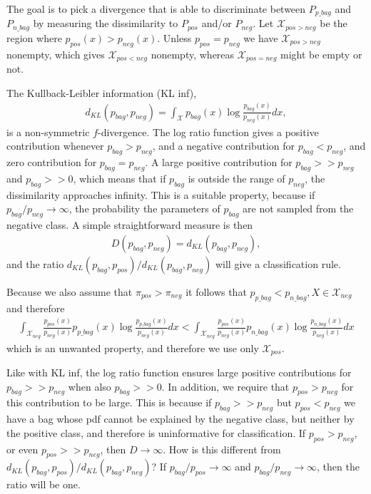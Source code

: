 The goal is to pick a divergence that is able to discriminate between $P_{p \_ bag}$ and $P_{n \_ bag}$ by measuring the dissimilarity to $P_{pos}$ and/or $P_{neg}$.
Let $\mathcal{X}_{pos > neg}$ be the region where $p_{pos}(x) > p_{neg}(x)$. 
Unless $p_{pos} = p_{neg}$ we have $\mathcal{X}_{pos > neg}$ nonempty, which gives $\mathcal{X}_{pos < neg}$ nonempty, whereas $\mathcal{X}_{pos = neg}$ might be empty or not. 

The Kullback-Leibler information (KL inf),
\begin{align}
  d_{KL}(p_{bag},p_{neg}) = \int_\mathcal{X} p_{bag}(x) \log \frac{p_{bag}(x)}{p_{neg}(x)} dx,
\end{align}
is a non-symmetric $f$-divergence.
The log ratio function gives a positive contribution whenever $p_{bag}>p_{neg}$, and a negative contribution for $p_{bag}<p_{neg}$, and zero contribution for $p_{bag} = p_{neg}$.
A large positive contribution for $p_{bag} >> p_{neg}$ and $p_{bag} >> 0$, which means that if $p_{bag}$ is outside the range of $p_{neg}$, the dissimilarity approaches infinity. 
This is a suitable property, because if $p_{bag}/p_{neg} \rightarrow \infty$, the probability the parameters of $p_{bag}$ are not sampled from the negative class. 
A simple straightforward measure is then
\begin{align}
  D(p_{bag},p_{neg}) = d_{KL} (p_{bag},p_{neg}),
\end{align}
and the ratio $d_{KL} (p_{bag},p_{pos})/d_{KL} (p_{bag},p_{neg})$ will give a classification rule.

Because we also assume that $\pi_{pos} > \pi_{neg}$ it follows that $p_{p \_ bag} < p_{n \_ bag}, X \in \mathcal{X}_{neg}$ and therefore 
\begin{align}
  \int_{\mathcal{X}_{neg}} \frac{p_{pos}(x)}{p_{neg}(x)} p_{p\_bag}(x) \log \frac{p_{p\_bag}(x)}{p_{neg}(x)} dx < \int_{\mathcal{X}_{neg}} \frac{p_{pos}(x)}{p_{neg}(x)} p_{n \_ bag}(x) \log \frac{p_{n \_bag}(x)}{p_{neg}(x)} dx
\end{align}
which is an unwanted property, and therefore we use only $\mathcal{X}_{pos}$.

Like with KL inf, the log ratio function ensures large positive contributions for $p_{bag} >> p_{neg}$ when also $p_{bag} >> 0$. 
In addition, we require that $p_{pos} > p_{neg}$ for this contribution to be large. 
This is because if $p_{bag} >> p_{neg}$ but $p_{pos} < p_{neg}$ we have a bag whose pdf cannot be explained by the negative class, but neither by the positive class, and therefore is uninformative for classification. 
If $p_{pos} > p_{neg}$, or even $p_{pos} >> p_{neg}$, then $D \rightarrow \infty$.
How is this different from $d_{KL}(p_{bag},p_{pos})/d_{KL}(p_{bag},p_{neg})$?
If $p_{bag}/p_{pos} \rightarrow \infty$ and $p_{bag}/p_{neg} \rightarrow \infty$, then the ratio will be one. 

